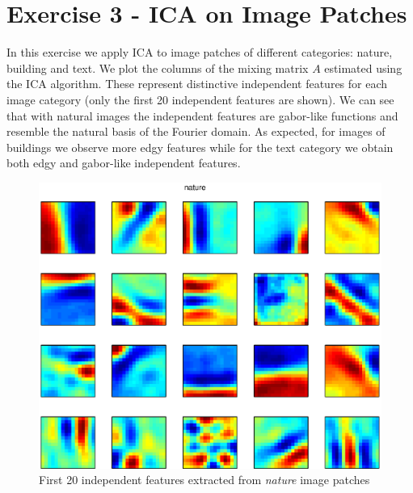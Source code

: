 \documentclass[a4paper,english]{article}
\begin{document}
\clearpage

\section*{Exercise 3 - ICA on Image Patches}

In this exercise we apply ICA to image patches of different categories: nature, building and text.
We plot the columns of the mixing matrix $A$ estimated using the ICA algorithm. These represent distinctive independent features for each image category (only the first 20 independent features are shown). We can see that with natural images the independent features are gabor-like functions and resemble the natural basis of the Fourier domain. 
As expected, for images of buildings we observe more edgy features while for the text category we obtain both edgy and gabor-like independent features.

\begin{figure}[h!]
\centering
\includegraphics[scale = .7]{nature_indfeats.eps}
\caption{First 20 independent features extracted from \emph{nature} image patches}
\end{figure}
\end{document}

